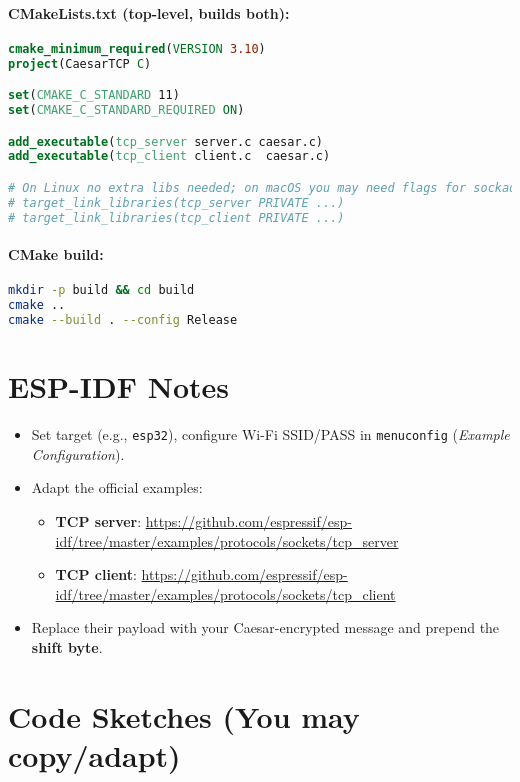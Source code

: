 \documentclass[11pt]{article}
\begin{document}
\paragraph{CMakeLists.txt (top-level, builds both):}
\begin{lstlisting}[language=CMake]
cmake_minimum_required(VERSION 3.10)
project(CaesarTCP C)

set(CMAKE_C_STANDARD 11)
set(CMAKE_C_STANDARD_REQUIRED ON)

add_executable(tcp_server server.c caesar.c)
add_executable(tcp_client client.c  caesar.c)

# On Linux no extra libs needed; on macOS you may need flags for sockaddr_in.
# target_link_libraries(tcp_server PRIVATE ...)
# target_link_libraries(tcp_client PRIVATE ...)
\end{lstlisting}

\paragraph{CMake build:}
\begin{lstlisting}[language=bash]
mkdir -p build && cd build
cmake ..
cmake --build . --config Release
\end{lstlisting}

\section*{ESP-IDF Notes}
\begin{itemize}
  \item Set target (e.g., \texttt{esp32}), configure Wi-Fi SSID/PASS in \texttt{menuconfig} (\textit{Example Configuration}).
  \item Adapt the official examples:
  \begin{itemize}
    \item \textbf{TCP server}: \url{https://github.com/espressif/esp-idf/tree/master/examples/protocols/sockets/tcp_server}
    \item \textbf{TCP client}: \url{https://github.com/espressif/esp-idf/tree/master/examples/protocols/sockets/tcp_client}
  \end{itemize}
  \item Replace their payload with your Caesar-encrypted message and prepend the \textbf{shift byte}.
\end{itemize}

\section*{Code Sketches (You may copy/adapt)}
\end{document}
